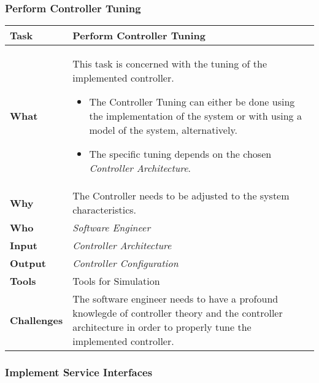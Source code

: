 \subsubsection{Perform Controller Tuning}
	\begin{tabularx}{\textwidth}{@{} l X @{}}
		\caption{Perform Controller Tuning} \label{table:ch6_Task_Perform_Controller_Tuning} \\
		\toprule 
		\bfseries Task & Perform Controller Tuning\\
		\midrule 
		\bfseries What & 
		This task is concerned with the tuning of the implemented controller. 
		\begin{itemize}
			\item The Controller Tuning can either be done using the implementation of the system or with using a model of the system, alternatively.
			\item The specific tuning depends on the chosen \emph{Controller Architecture}.
		\end{itemize}\\
		\midrule 
		\bfseries Why & The Controller needs to be adjusted to the system characteristics.\\
		\midrule 
		\bfseries Who & \emph{Software Engineer}\\
		\midrule 
		\bfseries Input & \emph{Controller Architecture}\\
		\midrule 
		\bfseries Output & \emph{Controller Configuration}\\
		\midrule
		\bfseries Tools & Tools for Simulation\\
		\midrule 
		\bfseries Challenges & The software engineer needs to have a profound knowlegde of controller theory and the controller architecture in order to properly tune the implemented controller.
		\\
		\bottomrule
	\end{tabularx}


\subsubsection{Implement Service Interfaces}

